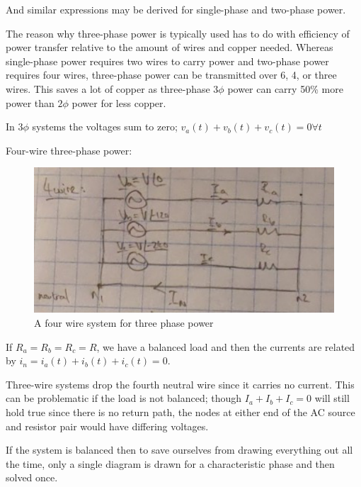 \documentclass[10pt]{article}
\begin{document}
And similar expressions may be derived for single-phase and two-phase power.


The reason why three-phase power is typically used has to do with efficiency of power transfer relative to the amount of wires and copper needed.
Whereas single-phase power requires two wires to carry power and two-phase power requires four wires, three-phase power can be transmitted over 6, 4, or three wires.
This saves a lot of copper as three-phase $ 3\phi $ power can carry 50\% more power than $ 2\phi $ power for less copper.



In $ 3\phi $ systems the voltages sum to zero; $ v_a(t) + v_b(t) + v_c(t) = 0 \forall t$ 

Four-wire three-phase power:


\begin{figure}[H]
	\centering
	\includegraphics[width=0.8\linewidth]{img/image_2022-09-18-02-19-51.png}
	\caption{A four wire system for three phase power}
\end{figure}

If $ R_a = R_b = R_c = R $, we have a balanced load and then the currents are related by $ i_n = i_a(t) + i_b(t) + i_c(t) = 0 $.


Three-wire systems drop the fourth neutral wire since it carries no current. This can be problematic if the load is not balanced; though $ I_a + I_b + I_c = 0$  will still hold true since there is no return path, the nodes at either end of the AC source and resistor pair would have differing voltages.


If the system is balanced then to save ourselves from drawing everything out all the time, only a single diagram is drawn for a characteristic phase and then solved once.
\end{document}
